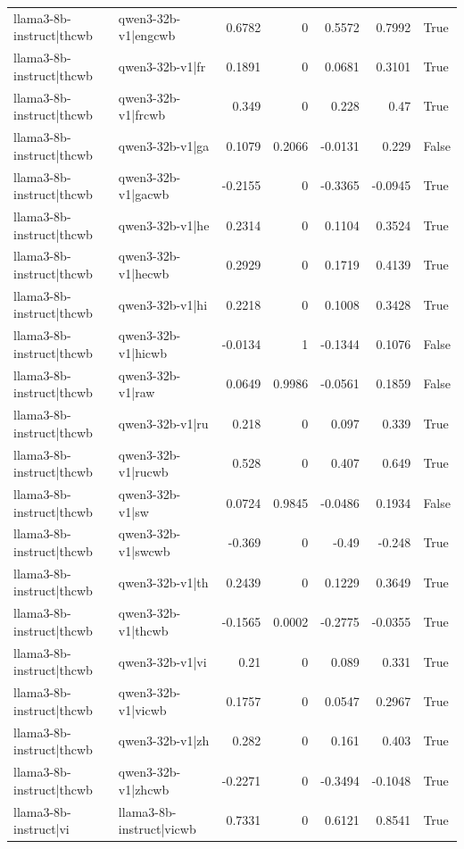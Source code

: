 \begin{table}
\begin{tabular}{l l r r r r l}
llama3-8b-instruct|thcwb & qwen3-32b-v1|engcwb & 0.6782 & 0 & 0.5572 & 0.7992 & True \\
llama3-8b-instruct|thcwb & qwen3-32b-v1|fr & 0.1891 & 0 & 0.0681 & 0.3101 & True \\
llama3-8b-instruct|thcwb & qwen3-32b-v1|frcwb & 0.349 & 0 & 0.228 & 0.47 & True \\
llama3-8b-instruct|thcwb & qwen3-32b-v1|ga & 0.1079 & 0.2066 & -0.0131 & 0.229 & False \\
llama3-8b-instruct|thcwb & qwen3-32b-v1|gacwb & -0.2155 & 0 & -0.3365 & -0.0945 & True \\
llama3-8b-instruct|thcwb & qwen3-32b-v1|he & 0.2314 & 0 & 0.1104 & 0.3524 & True \\
llama3-8b-instruct|thcwb & qwen3-32b-v1|hecwb & 0.2929 & 0 & 0.1719 & 0.4139 & True \\
llama3-8b-instruct|thcwb & qwen3-32b-v1|hi & 0.2218 & 0 & 0.1008 & 0.3428 & True \\
llama3-8b-instruct|thcwb & qwen3-32b-v1|hicwb & -0.0134 & 1 & -0.1344 & 0.1076 & False \\
llama3-8b-instruct|thcwb & qwen3-32b-v1|raw & 0.0649 & 0.9986 & -0.0561 & 0.1859 & False \\
llama3-8b-instruct|thcwb & qwen3-32b-v1|ru & 0.218 & 0 & 0.097 & 0.339 & True \\
llama3-8b-instruct|thcwb & qwen3-32b-v1|rucwb & 0.528 & 0 & 0.407 & 0.649 & True \\
llama3-8b-instruct|thcwb & qwen3-32b-v1|sw & 0.0724 & 0.9845 & -0.0486 & 0.1934 & False \\
llama3-8b-instruct|thcwb & qwen3-32b-v1|swcwb & -0.369 & 0 & -0.49 & -0.248 & True \\
llama3-8b-instruct|thcwb & qwen3-32b-v1|th & 0.2439 & 0 & 0.1229 & 0.3649 & True \\
llama3-8b-instruct|thcwb & qwen3-32b-v1|thcwb & -0.1565 & 0.0002 & -0.2775 & -0.0355 & True \\
llama3-8b-instruct|thcwb & qwen3-32b-v1|vi & 0.21 & 0 & 0.089 & 0.331 & True \\
llama3-8b-instruct|thcwb & qwen3-32b-v1|vicwb & 0.1757 & 0 & 0.0547 & 0.2967 & True \\
llama3-8b-instruct|thcwb & qwen3-32b-v1|zh & 0.282 & 0 & 0.161 & 0.403 & True \\
llama3-8b-instruct|thcwb & qwen3-32b-v1|zhcwb & -0.2271 & 0 & -0.3494 & -0.1048 & True \\
llama3-8b-instruct|vi & llama3-8b-instruct|vicwb & 0.7331 & 0 & 0.6121 & 0.8541 & True \\

\end{tabular}
\end{table}
